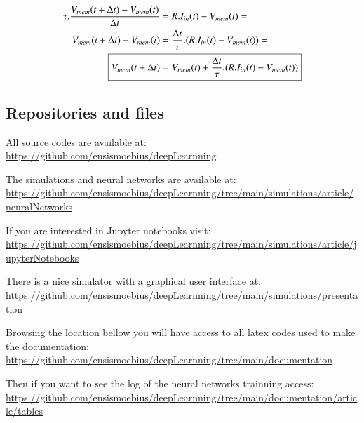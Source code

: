 		\begin{equation}
			\label{eq:membraneDerivative}
			\begin{aligned}
				\tau.\dfrac{V_{mem}(t+\Delta t) - V_{mem}(t)}{\Delta t} &= R.I_{in}(t) - V_{mem}(t) = \\
				V_{mem}(t+\Delta t) - V_{mem}(t) &= \frac{\Delta t}{\tau} . (R.I_{in}(t) - V_{mem}(t)) = \\
				\Aboxed{V_{mem}(t+\Delta t) &= V_{mem}(t) + \frac{\Delta t}{\tau} . (R.I_{in}(t) - V_{mem}(t))}
			\end{aligned}
		\end{equation}

	\subsection{Repositories and files}
		\par All source codes are available at: \\ \href{https://github.com/ensismoebius/deepLearnning}{https://github.com/ensismoebius/deepLearnning}
		\par The simulations and neural networks are available at: \\ \href{https://github.com/ensismoebius/deepLearnning/tree/main/simulations/article/neuralNetworks}{https://github.com/ensismoebius/deepLearnning/tree/main/simulations/article/neuralNetworks}
		\par If you are interested in Jupyter notebooks visit: \\
		\href{https://github.com/ensismoebius/deepLearnning/tree/main/simulations/article/jupyterNotebooks}{https://github.com/ensismoebius/deepLearnning/tree/main/simulations/article/jupyterNotebooks} 
		\par There is a nice simulator with a graphical user interface at: \\
		\href{https://github.com/ensismoebius/deepLearnning/tree/main/simulations/presentation}{https://github.com/ensismoebius/deepLearnning/tree/main/simulations/presentation}
		\par Browsing the location bellow you will have access to all latex codes used to make the documentation:\\
		\href{https://github.com/ensismoebius/deepLearnning/tree/main/documentation}{https://github.com/ensismoebius/deepLearnning/tree/main/documentation}
		\par Then if you want to see the log of the neural networks trainning access:\\
		\href{https://github.com/ensismoebius/deepLearnning/tree/main/documentation/article/tables}{https://github.com/ensismoebius/deepLearnning/tree/main/documentation/article/tables}
	